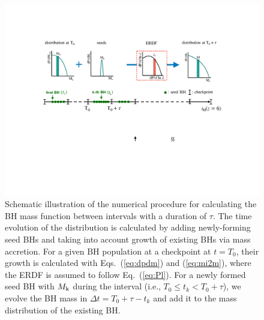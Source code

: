 \documentclass[twocolumn, twocolappendix]{aastex63}
\begin{document}
\begin{CJK*}{UTF8}{gbsn}
\begin{figure}
\centering
\includegraphics[width=170mm]{scheme1.pdf}
\caption{
Schematic illustration of the numerical procedure for calculating the BH mass function
between intervals with a duration of $\tau$.
The time evolution of the distribution is calculated by adding newly-forming seed BHs and 
taking into account growth of existing BHs via mass accretion.
For a given BH population at a checkpoint at $t=T_0$, their growth is calculated with Eqs.~(\ref{eq:dpdm}) and (\ref{eq:mi2m}),
where the ERDF is assumed to follow Eq.~(\ref{eq:Pl}).
For a newly formed seed BH with $M_{\rm k}$ during the interval (i.e., $T_0 \leq t_k < T_0+\tau$), 
we evolve the BH mass in $\Delta t = T_0+\tau -t_k$ and add it to the mass distribution of the existing BH.
}
\label{fig:scheme}
\vspace{8mm}
\end{figure}



\end{CJK*}
\end{document}
